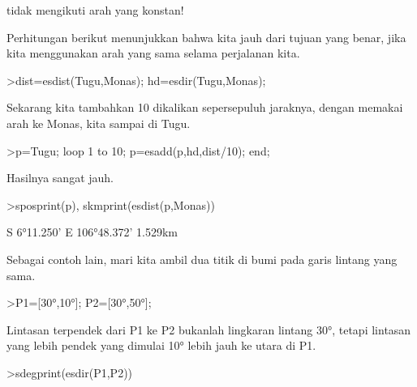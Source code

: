 \documentclass[a4paper,10pt]{article}
\begin{document}
\begin{eulernotebook}
\begin{eulercomment}
\begin{eulercomment}
\begin{eulercomment}
\begin{eulercomment}
\begin{eulercomment}
\begin{eulercomment}
\begin{eulercomment}
\begin{eulercomment}
\begin{eulercomment}
\begin{eulercomment}
\begin{eulercomment}
\begin{eulercomment}
\begin{eulercomment}
\begin{eulercomment}
\begin{eulercomment}
\begin{eulercomment}
\begin{eulercomment}
\begin{eulercomment}
\begin{eulercomment}
\begin{eulercomment}
\begin{eulercomment}
\begin{eulercomment}
\begin{eulercomment}
\begin{eulercomment}
\begin{eulercomment}
\begin{eulercomment}
\begin{eulercomment}
\begin{eulercomment}
\begin{eulercomment}
\begin{eulercomment}
\begin{eulercomment}
tidak mengikuti arah yang konstan!

Perhitungan berikut menunjukkan bahwa kita jauh dari tujuan yang
benar, jika kita menggunakan arah yang sama selama perjalanan kita.
\end{eulercomment}
\begin{eulerprompt}
>dist=esdist(Tugu,Monas); hd=esdir(Tugu,Monas);
\end{eulerprompt}
\begin{eulercomment}
Sekarang kita tambahkan 10 dikalikan sepersepuluh jaraknya, dengan
memakai arah ke Monas, kita sampai di Tugu.
\end{eulercomment}
\begin{eulerprompt}
>p=Tugu; loop 1 to 10; p=esadd(p,hd,dist/10); end;
\end{eulerprompt}
\begin{eulercomment}
Hasilnya sangat jauh.
\end{eulercomment}
\begin{eulerprompt}
>sposprint(p), skmprint(esdist(p,Monas))
\end{eulerprompt}
\begin{euleroutput}
  S 6°11.250' E 106°48.372'
       1.529km
\end{euleroutput}
\begin{eulercomment}
Sebagai contoh lain, mari kita ambil dua titik di bumi pada garis
lintang yang sama.
\end{eulercomment}
\begin{eulerprompt}
>P1=[30°,10°]; P2=[30°,50°];
\end{eulerprompt}
\begin{eulercomment}
Lintasan terpendek dari P1 ke P2 bukanlah lingkaran lintang 30°,
tetapi lintasan yang lebih pendek yang dimulai 10° lebih jauh ke utara
di P1.
\end{eulercomment}
\begin{eulerprompt}
>sdegprint(esdir(P1,P2))
\end{eulerprompt}
\begin{euleroutput}

\end{euleroutput}
\end{eulercomment}
\end{eulercomment}
\end{eulercomment}
\end{eulercomment}
\end{eulercomment}
\end{eulercomment}
\end{eulercomment}
\end{eulercomment}
\end{eulercomment}
\end{eulercomment}
\end{eulercomment}
\end{eulercomment}
\end{eulercomment}
\end{eulercomment}
\end{eulercomment}
\end{eulercomment}
\end{eulercomment}
\end{eulercomment}
\end{eulercomment}
\end{eulercomment}
\end{eulercomment}
\end{eulercomment}
\end{eulercomment}
\end{eulercomment}
\end{eulercomment}
\end{eulercomment}
\end{eulercomment}
\end{eulercomment}
\end{eulercomment}
\end{eulercomment}
\end{eulernotebook}
\end{document}
